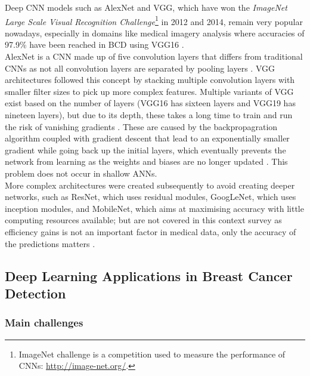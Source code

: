 Deep CNN models such as AlexNet and VGG, which have won the \textit{ImageNet Large Scale Visual Recognition Challenge}\footnote{ImageNet challenge is a competition used to measure the performance of CNNs: \url{http://image-net.org/}.} in 2012 and 2014, remain very popular nowadays, especially in domains like medical imagery analysis where accuracies of 97.9\% have been reached in BCD using VGG16 \citep{Wang2016}.\\

AlexNet is a CNN made up of five convolution layers that differs from traditional CNNs as not all convolution layers are separated by pooling layers \citep{Krizhevsky2012}. VGG architectures followed  this concept by stacking multiple convolution layers with smaller filter sizes to pick up more complex features. Multiple variants of VGG exist based on the number of layers (VGG16 has sixteen layers and VGG19 has nineteen layers), but due to its depth, these takes a long  time to train  and  run the risk of vanishing gradients \citep{simonyan2014very}. These are caused by the backpropagration algorithm coupled with gradient descent that lead to an exponentially smaller gradient while going  back up the initial layers, which eventually prevents the network from learning as the weights and biases are no longer updated \citep{russell2002artificial}. This problem does not occur in shallow ANNs.\\

More complex architectures were created subsequently to avoid creating deeper networks, such as ResNet, which uses residual modules, GoogLeNet, which uses inception modules, and MobileNet, which aims at maximising accuracy with little computing resources available; but are not covered in this context survey as efficiency gains is not an important factor in medical data, only the accuracy of the predictions matters \citep{Litjens2017}.


\subsection{Deep Learning Applications in Breast Cancer Detection}

\subsubsection{Main challenges}

